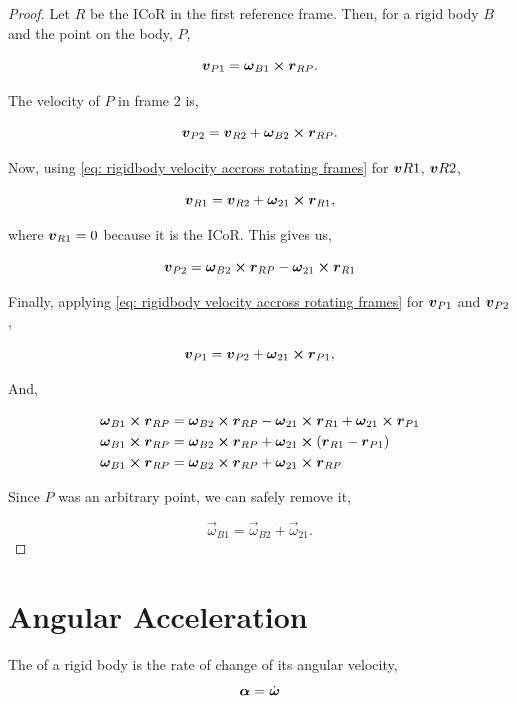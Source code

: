 \begin{proof}
    Let \(R\) be the ICoR in the first reference frame.
    Then, for a rigid body \(B\) and the point on the body, \(P\),

    \[\vv_{P1} = \vec{\omega}_{B1} \cp \vec{r}_{RP}.\]

The velocity of \(P\) in frame \(2\) is, 

\[\vv_{P2} = \vv_{R2} + \vec{\omega}_{B2} \cp \vec{r}_{RP}.\]

Now, using \cref{eq: rigidbody velocity accross rotating frames} for \(\boldsymbol{v}{R1}\), \(\boldsymbol{v}{R2}\),

\[\vv_{R1} = \vv_{R2} + \vec{\omega}_{21} \cp \vec{r}_{R1},\]

where \(\boldsymbol{v}_{R1} = 0\) because it is the ICoR. This gives us,

\[\vv_{P2} = \vec{\omega}_{B2} \cp \vec{r}_{RP} - \vec{\omega}_{21} \cp \vec{r}_{R1}\]

Finally, applying \cref{eq: rigidbody velocity accross rotating frames} for 
\(\boldsymbol{v}_{P1}\) and \(\boldsymbol{v}_{P2}\),

\[\vv_{P1} = \vv_{P2} + \vec{\omega}_{21} \cp \vec{r}_{P1},\]

And, 

\begin{align*}
    \vec{\omega}_{B1} \cp \vec{r}_{RP} &= \vec{\omega}_{B2} \cp \vec{r}_{RP} - \vec{\omega}_{21} \cp \vec{r}_{R1} + \vec{\omega}_{21} \cp \vec{r}_{P1} \\
    \vec{\omega}_{B1} \cp \vec{r}_{RP} &= \vec{\omega}_{B2} \cp \vec{r}_{RP} + \vec{\omega}_{21} \cp (\vec{r}_{R1} - \vec{r}_{P1}) \\
    \vec{\omega}_{B1} \cp \vec{r}_{RP} &= \vec{\omega}_{B2} \cp \vec{r}_{RP} + \vec{\omega}_{21} \cp \vec{r}_{RP}
\end{align*}

Since \(P\) was an arbitrary point, we can safely remove it, 

\begin{equation*}
    \vec{\omega}_{B1} = \vec{\omega}_{B2} + \vec{\omega}_{21}.
\end{equation*}

\end{proof}

\section{Angular Acceleration}

\begin{definition}
    The  of a rigid body is the rate of 
    change of its angular velocity,
    \begin{equation}
        \boldsymbol{\alpha} = \dot{\boldsymbol{\omega}}
    \end{equation}
\end{definition}

